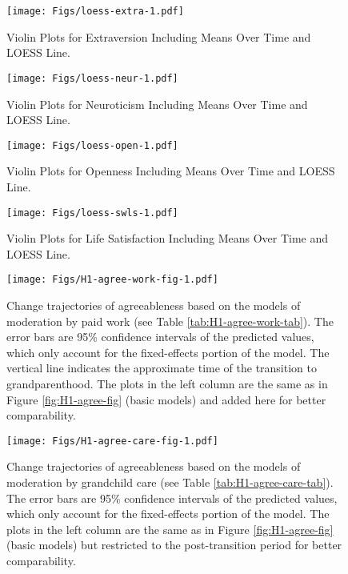 \documentclass[
  english,
  man,floatsintext]{apa7}
\begin{document}
\begin{figure}
\centering
\texttt{[image: Figs/loess-extra-1.pdf]}
\caption{\label{fig:loess-extra}Violin Plots for Extraversion Including Means Over Time and LOESS Line.}
\end{figure}



\begin{figure}
\centering
\texttt{[image: Figs/loess-neur-1.pdf]}
\caption{\label{fig:loess-neur}Violin Plots for Neuroticism Including Means Over Time and LOESS Line.}
\end{figure}



\begin{figure}
\centering
\texttt{[image: Figs/loess-open-1.pdf]}
\caption{\label{fig:loess-open}Violin Plots for Openness Including Means Over Time and LOESS Line.}
\end{figure}



\begin{figure}
\centering
\texttt{[image: Figs/loess-swls-1.pdf]}
\caption{\label{fig:loess-swls}Violin Plots for Life Satisfaction Including Means Over Time and LOESS Line.}
\end{figure}



\begin{figure}
\centering
\texttt{[image: Figs/H1-agree-work-fig-1.pdf]}
\caption{\label{fig:H1-agree-work-fig}Change trajectories of agreeableness based on the models of moderation by paid work (see Table \ref{tab:H1-agree-work-tab}). The error bars are 95\% confidence intervals of the predicted values, which only account for the fixed-effects portion of the model. The vertical line indicates the approximate time of the transition to grandparenthood. The plots in the left column are the same as in Figure \ref{fig:H1-agree-fig} (basic models) and added here for better comparability.}
\end{figure}



\begin{figure}
\centering
\texttt{[image: Figs/H1-agree-care-fig-1.pdf]}
\caption{\label{fig:H1-agree-care-fig}Change trajectories of agreeableness based on the models of moderation by grandchild care (see Table \ref{tab:H1-agree-care-tab}). The error bars are 95\% confidence intervals of the predicted values, which only account for the fixed-effects portion of the model. The plots in the left column are the same as in Figure \ref{fig:H1-agree-fig} (basic models) but restricted to the post-transition period for better comparability.}
\end{figure}
\end{document}
